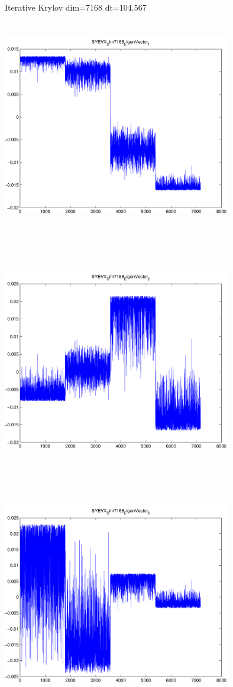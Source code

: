 \documentclass[9pt]{article}
\theoremstyle{plain}
\theoremstyle{definition}
\theoremstyle{remark}
\numberwithin{equation}{section}
\begin{document}
Iterative Krylov dim=7168 dt=104.567
\includegraphics[width=10.0cm,height=10.0cm]{SYEVX_Dim7168_EigenVector_1.pdf}

\includegraphics[width=10.0cm,height=10.0cm]{SYEVX_Dim7168_EigenVector_2.pdf}

\includegraphics[width=10.0cm,height=10.0cm]{SYEVX_Dim7168_EigenVector_3.pdf}
\end{document}

